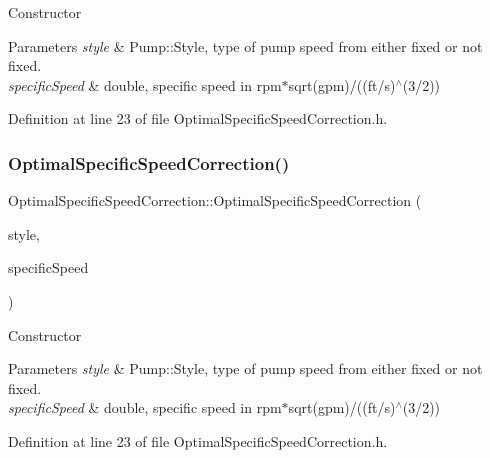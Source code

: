 Constructor 
\begin{DoxyParams}{Parameters}
{\em style} & Pump\+::\+Style, type of pump speed from either fixed or not fixed. \\
\hline
{\em specific\+Speed} & double, specific speed in rpm$\ast$sqrt(gpm)/((ft/s)$^\wedge$(3/2)) \\
\hline
\end{DoxyParams}


Definition at line 23 of file Optimal\+Specific\+Speed\+Correction.\+h.

\mbox{\label{class_optimal_specific_speed_correction_a8af4972dfd79881d9c9c9b0f47d922b9}} 
\subsubsection{\texorpdfstring{Optimal\+Specific\+Speed\+Correction()}{OptimalSpecificSpeedCorrection()}\hspace{0.1cm}{\footnotesize\ttfamily [2/3]}}
{\footnotesize\ttfamily Optimal\+Specific\+Speed\+Correction\+::\+Optimal\+Specific\+Speed\+Correction (\begin{DoxyParamCaption}\item[{const Pump\+::\+Style}]{style,  }\item[{const double}]{specific\+Speed }\end{DoxyParamCaption})\hspace{0.3cm}{\ttfamily [inline]}}

Constructor 
\begin{DoxyParams}{Parameters}
{\em style} & Pump\+::\+Style, type of pump speed from either fixed or not fixed. \\
\hline
{\em specific\+Speed} & double, specific speed in rpm$\ast$sqrt(gpm)/((ft/s)$^\wedge$(3/2)) \\
\hline
\end{DoxyParams}


Definition at line 23 of file Optimal\+Specific\+Speed\+Correction.\+h.

\mbox{\label{class_optimal_specific_speed_correction_a8af4972dfd79881d9c9c9b0f47d922b9}} 
